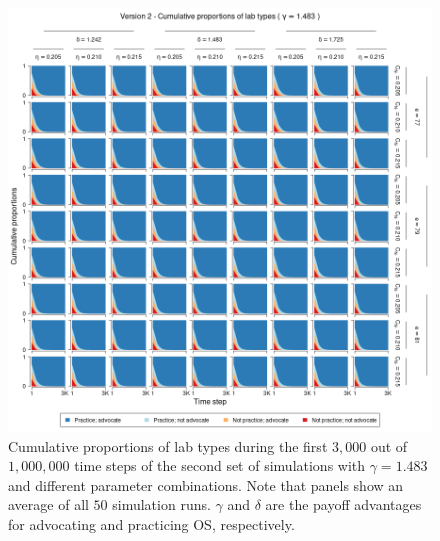 \documentclass[meta, authordate]{jote-new-article}
\begin{document}
\begin{figure}
  \begin{fullwidth}
    \centering
    \includegraphics[width=\textwidth]{v2_pro_plot_sens_payypro1.483.png}
    \caption{Cumulative proportions of lab types during the first $3,000$ out of $1,000,000$ time steps of the second set of simulations with $\gamma=1.483$ and different parameter combinations. Note that panels show an average of all $50$ simulation runs. $\gamma$ and $\delta$ are the payoff advantages for advocating and practicing OS, respectively.}
    \label{fig:v2_pro_plot_sens_payypro1.483}
  \end{fullwidth}
\end{figure}
%
%
\end{document}
